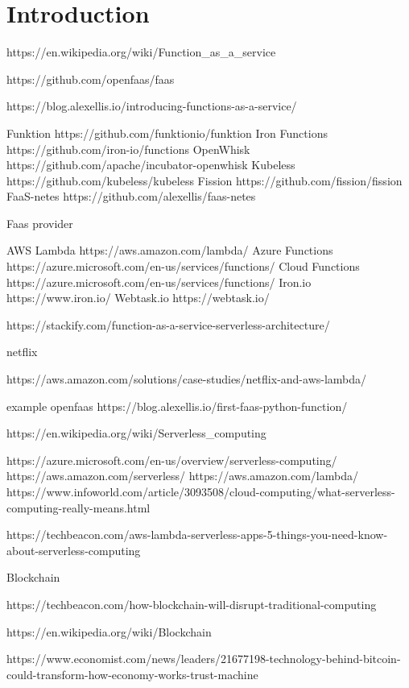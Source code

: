 \chapter{Introduction}



https://en.wikipedia.org/wiki/Function_as_a_service

https://github.com/openfaas/faas

https://blog.alexellis.io/introducing-functions-as-a-service/


Funktion  https://github.com/funktionio/funktion
Iron Functions https://github.com/iron-io/functions
OpenWhisk https://github.com/apache/incubator-openwhisk
Kubeless https://github.com/kubeless/kubeless
Fission https://github.com/fission/fission
FaaS-netes https://github.com/alexellis/faas-netes

Faas provider

AWS Lambda https://aws.amazon.com/lambda/
Azure Functions https://azure.microsoft.com/en-us/services/functions/
Cloud Functions https://azure.microsoft.com/en-us/services/functions/
Iron.io https://www.iron.io/
Webtask.io https://webtask.io/



https://stackify.com/function-as-a-service-serverless-architecture/

netflix

https://aws.amazon.com/solutions/case-studies/netflix-and-aws-lambda/


example openfaas
https://blog.alexellis.io/first-faas-python-function/

https://en.wikipedia.org/wiki/Serverless_computing


https://azure.microsoft.com/en-us/overview/serverless-computing/
https://aws.amazon.com/serverless/
https://aws.amazon.com/lambda/
https://www.infoworld.com/article/3093508/cloud-computing/what-serverless-computing-really-means.html

https://techbeacon.com/aws-lambda-serverless-apps-5-things-you-need-know-about-serverless-computing


Blockchain

https://techbeacon.com/how-blockchain-will-disrupt-traditional-computing

https://en.wikipedia.org/wiki/Blockchain

https://www.economist.com/news/leaders/21677198-technology-behind-bitcoin-could-transform-how-economy-works-trust-machine